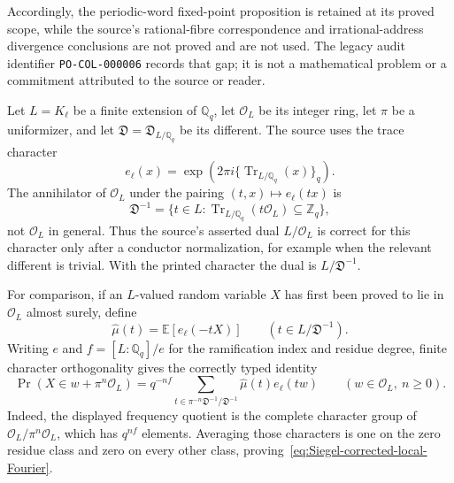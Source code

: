 Accordingly, the periodic-word fixed-point proposition is retained at its
proved scope, while the source's rational-fibre correspondence and
irrational-address divergence conclusions are not proved and are not used.
The legacy audit identifier \texttt{PO-COL-000006} records that gap; it is not
a mathematical problem or a commitment attributed to the source or reader.

\begin{sourceissue}
\label{issue:Siegel-v3-prop76}
Let $L=K_\ell$ be a finite extension of $\mathbb Q_q$, let
$\mathcal O_L$ be its integer ring, let $\pi$ be a uniformizer, and let
$\mathfrak D=\mathfrak D_{L/\mathbb Q_q}$ be its different.  The source uses
the trace character
\[
 e_\ell(x)=
 \exp\!\left(2\pi i
 \{\operatorname{Tr}_{L/\mathbb Q_q}(x)\}_q\right).
\]
The annihilator of $\mathcal O_L$ under the pairing
$(t,x)\mapsto e_\ell(tx)$ is
\[
 \mathfrak D^{-1}
 =\{t\in L:\operatorname{Tr}_{L/\mathbb Q_q}(t\mathcal O_L)
                    \subseteq\mathbb Z_q\},
\]
not $\mathcal O_L$ in general.  Thus the source's asserted dual
$L/\mathcal O_L$ is correct for this character only after a
conductor normalization, for example when the relevant different is
trivial.  With the printed character the dual is
$L/\mathfrak D^{-1}$.

For comparison, if an $L$-valued random variable $X$ has first been proved
to lie in $\mathcal O_L$ almost surely, define
\[
 \widehat\mu(t)=\mathbb E[e_\ell(-tX)]
 \qquad(t\in L/\mathfrak D^{-1}).
\]
Writing $e$ and $f=[L:\mathbb Q_q]/e$ for the ramification index and residue
degree, finite character orthogonality gives the correctly typed identity
\begin{equation}
\label{eq:Siegel-corrected-local-Fourier}
\Pr(X\in w+\pi^n\mathcal O_L)
=q^{-nf}
 \sum_{t\in\pi^{-n}\mathfrak D^{-1}/\mathfrak D^{-1}}
   \widehat\mu(t)e_\ell(tw)
\qquad(w\in\mathcal O_L,\ n\geq0).
\end{equation}
Indeed, the displayed frequency quotient is the complete character group of
$\mathcal O_L/\pi^n\mathcal O_L$, which has $q^{nf}$ elements.  Averaging
those characters is one on the zero residue class and zero on every other
class, proving~\eqref{eq:Siegel-corrected-local-Fourier}.


\end{sourceissue}
